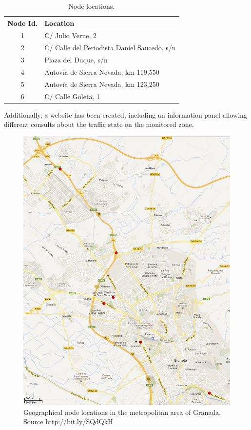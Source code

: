 \documentclass{llncs}
\begin{document}
 \begin{table}
 \begin{center}
 \begin{tabular}{|c|l|}
 \hline
Node Id.  &  Location      \\
 \hline
    1     &  C/ Julio Verne, 2    \\
 \hline
    2     &  C/ Calle del Periodista Daniel Saucedo, s/n    \\
 \hline
    3     &  Plaza del Duque, s/n    \\
 \hline
    4     &  Autovía de Sierra Nevada, km 119,550    \\
 \hline
    5     &  Autovía de Sierra Nevada, km 123,250    \\
 \hline
    6     &  C/ Calle Goleta, 1    \\
 \hline
 \end{tabular}
 \end{center}
 \caption{Node locations.
 \label{localizaciones}}
 \end{table}

Additionally, a website has been created, including an information panel allowing different consults about the traffic state on the monitored zone.

\begin{figure}[htpb] 
\begin{center} 
\includegraphics[scale=0.35]{mapa.png}
\end{center} 
\caption{Geographical node locations in the metropolitan area of Granada. Source http://bit.ly/SQdQkH} 
\label{mapa} 
\end{figure}
\end{document}
